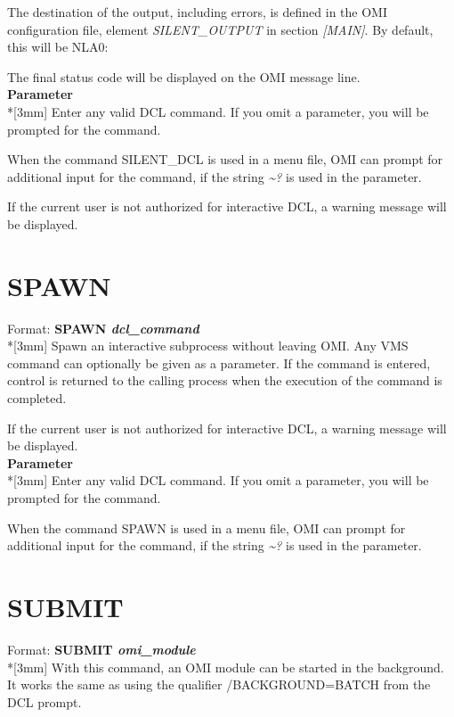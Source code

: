\documentclass[a4paper]{book}
\renewcommand{\indent}{\hspace*{5mm}}
\begin{document}
The destination of the output, including errors, is defined in the OMI 
configuration file, element \textsl{SILENT{\_}OUTPUT} in section \textsl{[MAIN]}. By default, 
this will be NLA0:

The final status code will be displayed on the OMI message line.\\[3mm]
\textbf{Parameter}\\*[3mm]
Enter any valid DCL command. If you omit a parameter, you will be prompted 
for the command.

When the command \textsf{SILENT{\_}DCL} is used in a menu file, OMI can prompt for 
additional input for the command, if the string \textsl{\~{}?} is used in the parameter.

If the current user is not authorized for interactive DCL, a warning message 
will be displayed.

\section{SPAWN}
\label{subsec:spawn}

\indent Format: \textbf{SPAWN \textit{dcl{\_}command}}\\*[3mm]
Spawn an interactive subprocess without leaving OMI. Any VMS command can 
optionally be given as a parameter. If the command is entered, control is 
returned to the calling process when the execution of the command is 
completed.

If the current user is not authorized for interactive DCL, a warning message 
will be displayed.\\[3mm]
\textbf{Parameter}\\*[3mm]
Enter any valid DCL command. If you omit a parameter, you will be prompted 
for the command.

When the command SPAWN is used in a menu file, OMI can prompt for additional 
input for the command, if the string \textsl{\~{}?} is used in the parameter.

\section{SUBMIT}
\label{subsec:submit}

\indent Format: \textbf{SUBMIT \textit{omi{\_}module}}\\*[3mm]
With this command, an OMI module can be started in the background. It works 
the same as using the qualifier \textsf{/BACKGROUND=BATCH} from the DCL 
prompt.
\end{document}
